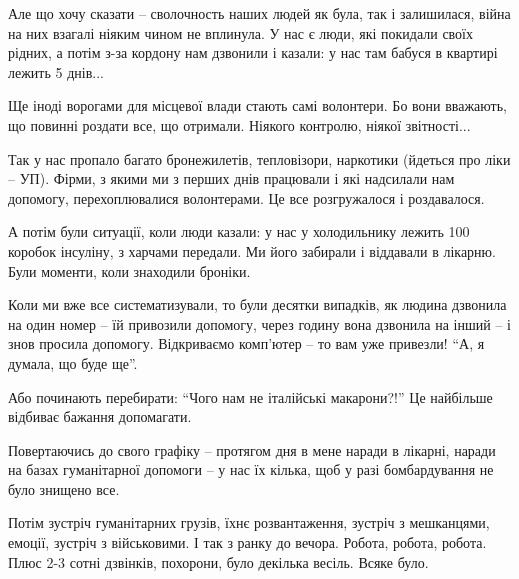 Але що хочу сказати – сволочность наших людей як була, так і залишилася, війна
на них взагалі ніяким чином не вплинула. У нас є люди, які покидали своїх
рідних, а потім з-за кордону нам дзвонили і казали: у нас там бабуся в квартирі
лежить 5 днів... 

Ще іноді ворогами для місцевої влади стають самі волонтери. Бо вони вважають,
що повинні роздати все, що отримали. Ніякого контролю, ніякої звітності... 

Так у нас пропало багато бронежилетів, тепловізори, наркотики (йдеться про ліки
– УП). Фірми, з якими ми з перших днів працювали і які надсилали нам допомогу,
перехоплювалися волонтерами. Це все розгружалося і роздавалося.

А потім були ситуації, коли люди казали: у нас у холодильнику лежить 100
коробок інсуліну, з харчами передали. Ми його забирали і віддавали в лікарню.
Були моменти, коли знаходили броніки.

Коли ми вже все систематизували, то були десятки випадків, як людина дзвонила
на один номер – їй привозили допомогу, через годину вона дзвонила на інший – і
знов просила допомогу. Відкриваємо комп'ютер – то вам уже привезли! \enquote{А, я
думала, що буде ще}.

Або починають перебирати: \enquote{Чого нам не італійські макарони?!} Це найбільше
відбиває бажання допомагати.

Повертаючись до свого графіку – протягом дня в мене наради в лікарні, наради на
базах гуманітарної допомоги – у нас їх кілька, щоб у разі бомбардування не було
знищено все. 

Потім зустріч гуманітарних грузів, їхнє розвантаження, зустріч з мешканцями,
емоції, зустріч з військовими. І так з ранку до вечора. Робота, робота, робота.
Плюс 2-3 сотні дзвінків, похорони, було декілька весіль. Всяке було. 
